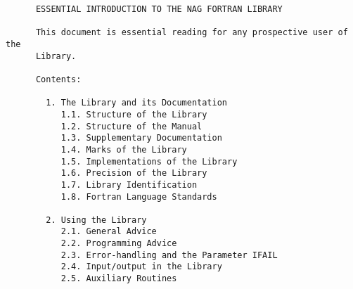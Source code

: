 \begin{small}
\begin{verbatim}
      ESSENTIAL INTRODUCTION TO THE NAG FORTRAN LIBRARY                           
                                                                                  
      This document is essential reading for any prospective user of the          
      Library.                                                                    
                                                                                  
      Contents:                                                                   
                                                                                  
        1. The Library and its Documentation                                      
           1.1. Structure of the Library                                          
           1.2. Structure of the Manual                                           
           1.3. Supplementary Documentation                                       
           1.4. Marks of the Library                                              
           1.5. Implementations of the Library                                    
           1.6. Precision of the Library                                          
           1.7. Library Identification                                            
           1.8. Fortran Language Standards                                        
                                                                                  
        2. Using the Library                                                      
           2.1. General Advice                                                    
           2.2. Programming Advice                                                
           2.3. Error-handling and the Parameter IFAIL                            
           2.4. Input/output in the Library                                       
           2.5. Auxiliary Routines                                                
                                                                                  

\end{verbatim}
\end{small}

